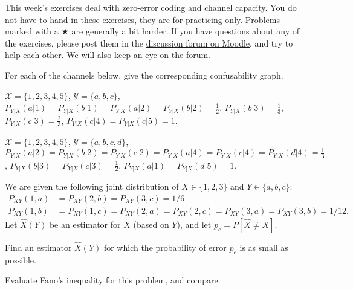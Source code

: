 \documentclass[a4paper,10pt,landscape,twocolumn]{scrartcl}
\begin{document}
\practiceproblems

{\sffamily\noindent
This week's exercises deal with zero-error coding and channel capacity. You do not have to hand in these exercises, they are for practicing only. Problems marked with a $\bigstar$ are generally a bit harder. If you have questions about any of the exercises, please post them in the \href{https://www.moodle.ch/lms/mod/forum/view.php?id=1761}{discussion forum on Moodle}, and try to help each other. We will also keep an eye on the forum.
}

\begin{exercise}
For each of the channels below, give the corresponding confusability graph.
	\begin{subex}
	$\mathcal{X} = \{1,2,3,4,5\}$, $\mathcal{Y} = \{a,b,c\}$, $P_{Y|X}(a|1) = P_{Y|X}(b|1) = P_{Y|X}(a|2) = P_{Y|X}(b|2) = \frac{1}{2}$, $P_{Y|X}(b|3) = \frac{1}{3}$, $P_{Y|X}(c|3) = \frac{2}{3}$, $P_{Y|X}(c|4) = P_{Y|X}(c|5) = 1$.
	\end{subex}
	\begin{subex}
	$\mathcal{X} = \{1,2,3,4,5\}$, $\mathcal{Y} = \{a,b,c,d\}$, $P_{Y|X}(a|2) = P_{Y|X}(b|2) = P_{Y|X}(c|2) = P_{Y|X}(a|4) = P_{Y|X}(c|4) = P_{Y|X}(d|4) = \frac{1}{3}$, $P_{Y|X}(b|3) = P_{Y|X}(c|3) = \frac{1}{2}$, $P_{Y|X}(a|1) = P_{Y|X}(d|5) = 1$.
	\end{subex}
\end{exercise}

\begin{exercise}[]
We are given the following joint distribution of $X \in \{1,2,3\}$ and $Y \in \{a,b,c\}$:
\begin{align*}
P_{XY}(1,a) &= P_{XY}(2,b) = P_{XY}(3,c) = 1/6\\
P_{XY}(1,b) &= P_{XY}(1,c) = P_{XY}(2,a) = P_{XY}(2,c) = P_{XY}(3,a) = P_{XY}(3,b) = 1/12.
\end{align*}
Let $\hat{X}(Y)$ be an estimator for $X$ (based on $Y$), and let $p_{e} = P[\hat{X} \neq X]$.
	\begin{subex}
	Find an estimator $\hat{X}(Y)$ for which the probability of error $p_e$ is as small as possible.
	\end{subex}
	\begin{subex}
	Evaluate Fano's inequality for this problem, and compare.
	\end{subex}
\end{exercise}
\end{document}
